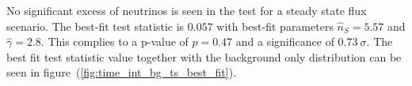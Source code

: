 No significant excess of neutrinos is seen in the test for a steady state flux scenario.
The best-fit test statistic is $\num{0.057}$ with best-fit parameters $\hat{n}_S = \num{5.57}$ and $\hat{\gamma} = \num{2.8}$.
This complies to a p-value of $p=0.47$ and a significance of $\SI{0.73}{\sigma}$.
The  best fit test statistic value together with the background only distribution can be seen in figure~(\ref{fig:time_int_bg_ts_best_fit}).


